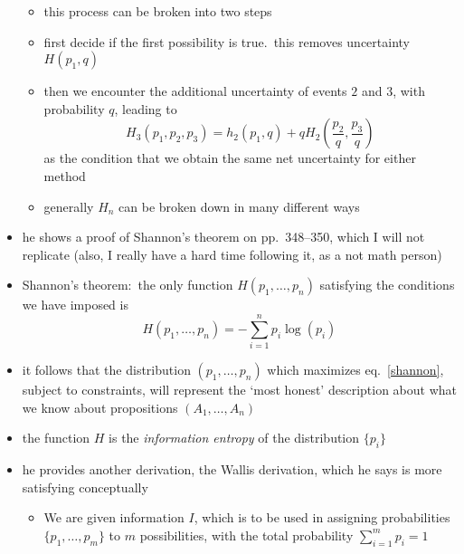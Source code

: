\documentclass[../jaynes_prob_theory_notes.tex]{subfiles}
\begin{document}
\begin{itemize}
                        \begin{itemize}
                            \item this process can be broken into two steps
                            \item first decide if the first possibility is true.\ this removes uncertainty $H(p_1, q)$
                            \item then we encounter the additional uncertainty of events $2$ and $3$, with probability $q$, leading to
                                \begin{equation*} 
                                    H_3 (p_1, p_2, p_3) = h_2 (p_1, q) + q H_2 \left (\frac{p_2}{q}, \frac{p_3}{q} \right)
                                \end{equation*}
                                as the condition that we obtain the same net uncertainty for either method
                            \item generally $H_n$ can be broken down in many different ways
                        \end{itemize}
                    \item he shows a proof of Shannon's theorem on pp.\ 348--350, which I will not replicate (also, I really have a hard time following it, as a not math person)
                    \item Shannon's theorem:\ the only function $H(p_1, \ldots, p_n)$ satisfying the conditions we have imposed is
                        \begin{equation} 
                            \label{shannon}
                            H(p_1, \ldots, p_n) = - \sum\limits^{n}_{i=1} p_i \log (p_i)
                        \end{equation}
                    \item it follows that the distribution $(p_1, \ldots, p_n)$ which maximizes eq.~\ref{shannon}, subject to constraints, will represent the `most honest' description about what we know about propositions $(A_1, \ldots, A_n)$
                    \item the function $H$ is the \textit{information entropy} of the distribution $\{p_i\}$
                    \item he provides another derivation, the Wallis derivation, which he says is more satisfying conceptually
                        \begin{itemize} 
                            \item We are given information $I$, which is to be used in assigning probabilities $\{p_1, \ldots, p_m\}$ to $m$ possibilities, with the total probability $\sum^{m}_{i=1} p_i = 1$

\end{itemize}
\end{itemize}
\end{document}
